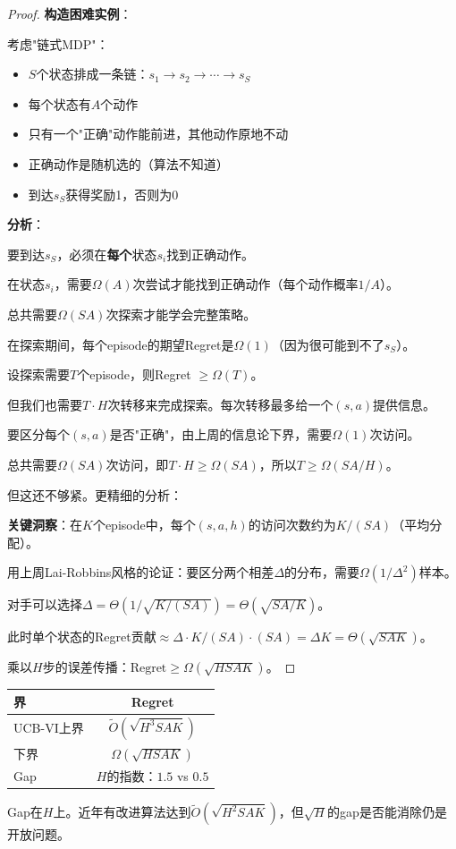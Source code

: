 \documentclass[11pt,a4paper]{article}
\theoremstyle{definition}
\begin{document}
\begin{proof}
\textbf{构造困难实例}：

考虑"链式MDP"：
\begin{itemize}
    \item $S$个状态排成一条链：$s_1 \to s_2 \to \cdots \to s_S$
    \item 每个状态有$A$个动作
    \item 只有一个"正确"动作能前进，其他动作原地不动
    \item 正确动作是随机选的（算法不知道）
    \item 到达$s_S$获得奖励1，否则为0
\end{itemize}

\textbf{分析}：

要到达$s_S$，必须在\textbf{每个}状态$s_i$找到正确动作。

在状态$s_i$，需要$\Omega(A)$次尝试才能找到正确动作（每个动作概率$1/A$）。

总共需要$\Omega(SA)$次探索才能学会完整策略。

在探索期间，每个episode的期望Regret是$\Omega(1)$（因为很可能到不了$s_S$）。

设探索需要$T$个episode，则Regret $\geq \Omega(T)$。

但我们也需要$T \cdot H$次转移来完成探索。每次转移最多给一个$(s,a)$提供信息。

要区分每个$(s,a)$是否"正确"，由上周的信息论下界，需要$\Omega(1)$次访问。

总共需要$\Omega(SA)$次访问，即$T \cdot H \geq \Omega(SA)$，所以$T \geq \Omega(SA/H)$。

但这还不够紧。更精细的分析：

\textbf{关键洞察}：在$K$个episode中，每个$(s,a,h)$的访问次数约为$K/(SA)$（平均分配）。

用上周Lai-Robbins风格的论证：要区分两个相差$\Delta$的分布，需要$\Omega(1/\Delta^2)$样本。

对手可以选择$\Delta = \Theta(1/\sqrt{K/(SA)}) = \Theta(\sqrt{SA/K})$。

此时单个状态的Regret贡献$\approx \Delta \cdot K/(SA) \cdot (SA) = \Delta K = \Theta(\sqrt{SAK})$。

乘以$H$步的误差传播：$\text{Regret} \geq \Omega(\sqrt{HSAK})$。
\end{proof}

\begin{keypoint}[上界与下界的gap]
\begin{center}
\begin{tabular}{l|c}
\toprule
界 & Regret \\
\midrule
UCB-VI上界 & $\tilde{O}(\sqrt{H^3 SAK})$ \\
下界 & $\Omega(\sqrt{HSAK})$ \\
Gap & $H$的指数：$1.5$ vs $0.5$ \\
\bottomrule
\end{tabular}
\end{center}

Gap在$H$上。近年有改进算法达到$\tilde{O}(\sqrt{H^2 SAK})$，但$\sqrt{H}$的gap是否能消除仍是开放问题。
\end{keypoint}
\end{document}

